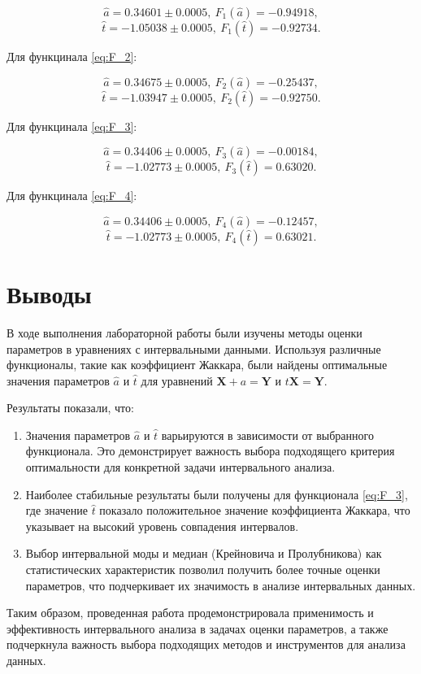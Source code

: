 \documentclass{article}
\begin{document}
  \[ \hat a = 0.34601 \pm 0.0005, \ F_1 (\hat a) = -0.94918, \]
  \[ \hat t = -1.05038 \pm 0.0005, \ F_1 (\hat t) = -0.92734. \]

  Для функцинала \ref{eq:F_2}:

  \[ \hat a = 0.34675 \pm 0.0005, \ F_2 (\hat a) = -0.25437, \]
  \[ \hat t = -1.03947 \pm 0.0005, \ F_2 (\hat t) = -0.92750. \]

  Для функцинала \ref{eq:F_3}:

  \[ \hat a = 0.34406 \pm 0.0005, \ F_3 (\hat a) = -0.00184, \]
  \[ \hat t = -1.02773 \pm 0.0005, \ F_3 (\hat t) = 0.63020. \]

  Для функцинала \ref{eq:F_4}:

  \[ \hat a = 0.34406 \pm 0.0005, \ F_4 (\hat a) = -0.12457, \]
  \[ \hat t = -1.02773 \pm 0.0005, \ F_4 (\hat t) = 0.63021. \]

  \section{Выводы}

  В ходе выполнения лабораторной работы были изучены методы оценки
  параметров в уравнениях с интервальными данными. Используя различные
  функционалы, такие как коэффициент Жаккара, были найдены оптимальные
  значения параметров \( \hat a \) и \( \hat t \) для уравнений
  \( \mathbf{X} + a = \mathbf{Y} \) и \( t\mathbf{X} = \mathbf{Y} \).

  Результаты показали, что:

  \begin{enumerate}
    \item Значения параметров \( \hat a \) и \( \hat t \) варьируются в
      зависимости от выбранного функционала. Это демонстрирует важность
      выбора подходящего критерия оптимальности для конкретной задачи
      интервального анализа.
    \item Наиболее стабильные результаты были получены для функционала
      \ref{eq:F_3}, где значение \( \hat t \) показало положительное
      значение коэффициента Жаккара, что указывает на высокий уровень
      совпадения интервалов.
    \item Выбор интервальной моды и медиан (Крейновича и Пролубникова) как
      статистических характеристик позволил получить более точные оценки
      параметров, что подчеркивает их значимость в анализе интервальных
      данных.
  \end{enumerate}

  Таким образом, проведенная работа продемонстрировала применимость и
  эффективность интервального анализа в задачах оценки параметров, а также
  подчеркнула важность выбора подходящих методов и инструментов для
  анализа данных.
\end{document}
